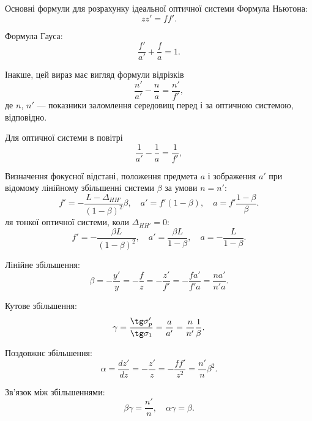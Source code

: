 \begin{Theory}{Основні формули для розрахунку ідеальної оптичної системи}
	Формула Ньютона:
	\begin{equation}
		zz' = ff'.
	\end{equation}

	Формула Гауса:
	\begin{equation}\label{eq:Gauss}
		\frac{f'}{a'} + \frac{f}{a} = 1.
	\end{equation}

	Інакше, цей вираз має вигляд формули відрізків
	\begin{equation}\label{eq:Gauss_a}
		\frac{n'}{a'} - \frac{n}{a} = \frac{n'}{f'}, \tag{\theequation a}
	\end{equation}
	де $n$, $n'$ --- показники заломлення середовищ перед і за оптичною системою, відповідно.

    Для оптичної системи в повітрі
   	\begin{equation}\label{eq:Gauss_b}
        \frac{1}{a'} - \frac{1}{a} = \frac{1}{f'}, \tag{\theequation б}
    \end{equation}

	Визначення фокусної відстані, положення предмета $a$ і зображення $a'$ при відомому лінійному збільшенні системи $\beta$ за умови $n = n'$:
	\begin{equation}\label{eq:thick_opt_sys}
		f' = - \frac{L - \Delta_{HH'}}{(1 - \beta)^2}\beta, \quad a' = f'(1- \beta), \quad a = f'\frac{1- \beta}{\beta}.
	\end{equation}
	ля тонкої оптичної системи, коли $\Delta_{HH'} = 0$:
	\begin{equation}\label{eq:thin_opt_sys}
		f' = - \frac{\beta L}{(1 - \beta)^2}, \quad a' = \frac{\beta L}{1- \beta}, \quad a = - \frac{L}{1 - \beta}. \tag{\theequation a}
	\end{equation}

	Лінійне збільшення:
	\begin{equation}\label{eq:lens_linear_increas}
		\beta = -\frac{y'}{y} = -\frac{f}{z} = -\frac{z'}{f'} = - \frac{fa'}{f'a} =  \frac{na'}{n'a}.
	\end{equation}

	Кутове збільшення:
	\begin{equation}
		\gamma = \frac{\tg\sigma'_p}{\tg\sigma_1} = \frac{a}{a'} = \frac{n}{n'} \frac1\beta.
	\end{equation}

	Поздовжнє збільшення:
	\begin{equation}
		\alpha = \frac{d z'}{d z} = - \frac{z'}{z} = - \frac{ff'}{z^2} = \frac{n'}{n} \beta^2.
	\end{equation}

	Зв'язок між збільшеннями:
	\begin{equation}
		\beta\gamma = \frac{n'}{n}, \quad \alpha\gamma = \beta.
	\end{equation}

\end{Theory}





